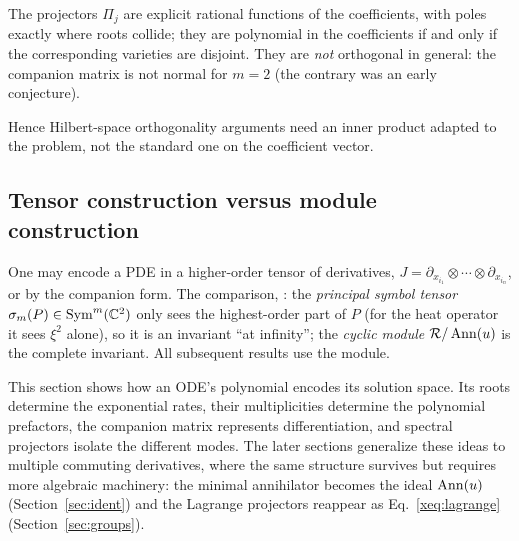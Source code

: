 \begin{proposition}
The projectors $\Pi_j$ are explicit rational functions of the coefficients, with poles exactly where roots collide; they are polynomial in the coefficients if and only if the corresponding varieties are disjoint. They are \emph{not} orthogonal in general: the companion matrix is not normal for $m=2$ \falsest{} (the contrary was an early conjecture).
\end{proposition}
Hence Hilbert-space orthogonality arguments need an inner product adapted to the problem, not the standard one on the coefficient vector.

\subsection{Tensor construction versus module construction}
One may encode a PDE in a higher-order tensor of derivatives, $J=\partial_{x_{i_1}}\otimes\cdots\otimes\partial_{x_{i_n}}$, or by the companion form. The comparison, : the \emph{principal symbol tensor} $\sigma_m(P)\in\mathrm{Sym}^m(\mathbb{C}^2)$ only sees the highest-order part of $P$ (for the heat operator it sees $\xi^2$ alone), so it is an invariant ``at infinity''; the \emph{cyclic module} $\mathcal{R}/\operatorname{Ann}(u)$ is the complete invariant. All subsequent results use the module.

\begin{keypoint}
This section shows how an ODE's polynomial encodes its solution space. Its roots determine the exponential rates, their multiplicities determine the polynomial prefactors, the companion matrix represents differentiation, and spectral projectors isolate the different modes. The later sections generalize these ideas to multiple commuting derivatives, where the same structure survives but requires more algebraic machinery: the minimal annihilator becomes the ideal $\operatorname{Ann}(u)$ (Section~\ref{sec:ident}) and the Lagrange projectors reappear as Eq.~\eqref{xeq:lagrange} (Section~\ref{sec:groups}).
\end{keypoint}

